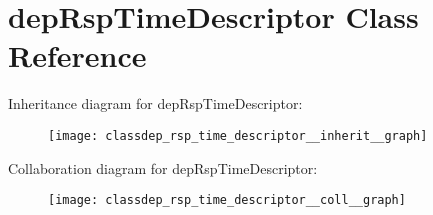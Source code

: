 \hypertarget{classdep_rsp_time_descriptor}{}\section{dep\+Rsp\+Time\+Descriptor Class Reference}
\label{classdep_rsp_time_descriptor}


Inheritance diagram for dep\+Rsp\+Time\+Descriptor\+:\nopagebreak
\begin{figure}[H]
\begin{center}
\leavevmode
\texttt{[image: classdep\_rsp\_time\_descriptor\_\_inherit\_\_graph]}
\end{center}
\end{figure}


Collaboration diagram for dep\+Rsp\+Time\+Descriptor\+:\nopagebreak
\begin{figure}[H]
\begin{center}
\leavevmode
\texttt{[image: classdep\_rsp\_time\_descriptor\_\_coll\_\_graph]}
\end{center}
\end{figure}
